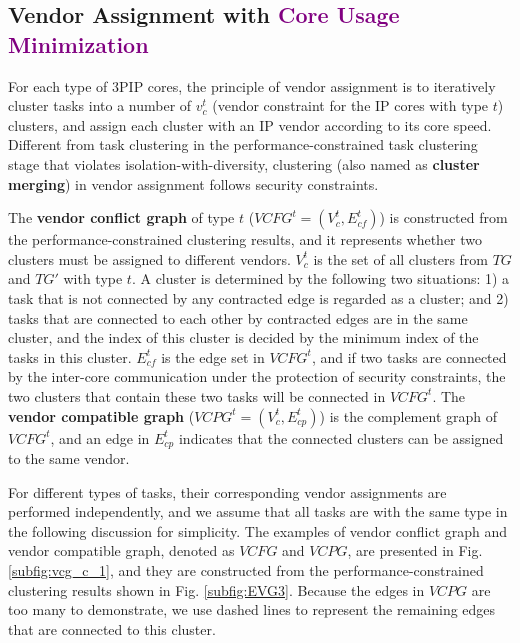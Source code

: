 \documentclass[10pt,journal, compsoc]{IEEEtran}
\begin{document}
\subsection{Vendor Assignment with \textcolor{purple}{Core Usage Minimization}}


For each type of 3PIP cores, the principle of vendor assignment is to iteratively cluster tasks into a number of $v^t_c$ (vendor constraint for the IP cores with type $t$) clusters, and assign each cluster with an IP vendor according to its core speed. Different from task clustering in the performance-constrained task clustering stage that violates isolation-with-diversity, clustering (also named as \textbf{cluster merging}) in vendor assignment follows security constraints.

The \textbf{vendor conflict graph} of type $t$ ($VCFG^t=(V^t_c, E^t_{cf})$) is constructed from the performance-constrained clustering results, and it represents whether two clusters must be assigned to different vendors. $V^t_c$ is the set of all clusters from $TG$ and $TG'$ with type $t$. A cluster is determined by the following two situations: 1) a task that is not connected by any contracted edge is regarded as a cluster; and 2) tasks that are connected to each other by contracted edges are in the same cluster, and the index of this cluster is decided by the minimum index of the tasks in this cluster. $E^t_{cf}$ is the edge set in $VCFG^t$, and if two tasks are connected by the inter-core communication under the protection of security constraints, the two clusters that contain these two tasks will be connected in $VCFG^t$. The \textbf{vendor compatible graph} ($VCPG^t=(V^t_c, E^t_{cp})$) is the complement graph of $VCFG^t$, and an edge in $E^t_{cp}$ indicates that the connected clusters can be assigned to the same vendor.


For different types of tasks, their corresponding vendor assignments are performed independently, and we assume that all tasks are with the same type in the following discussion for simplicity. The examples of vendor conflict graph and vendor compatible graph, denoted as $VCFG$ and $VCPG$, are presented in Fig. \ref{subfig:vcg_c_1}, and they are constructed from the performance-constrained clustering results shown in Fig. \ref{subfig:EVG3}. Because the edges in $VCPG$ are too many to demonstrate, we use dashed lines to represent the remaining edges that are connected to this cluster.
\end{document}
